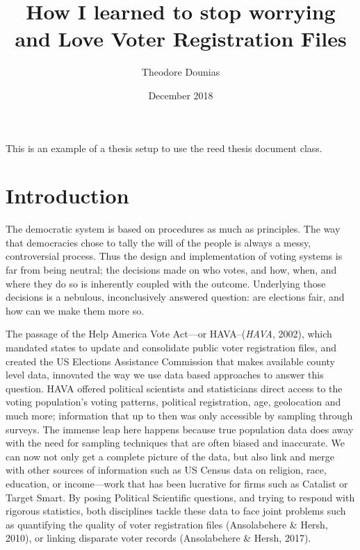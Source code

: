 \documentclass[12pt,twoside]{reedthesis}
\title{How I learned to stop worrying and Love Voter Registration Files}
\author{Theodore Dounias}
\date{December 2018}
\begin{document}
      \maketitle
  
  \frontmatter %
  \pagestyle{empty} %

  
      \begin{preface}
      This is an example of a thesis setup to use the reed thesis document
      class.
    \end{preface}
  
      \hypersetup{linkcolor=black}
    \setcounter{tocdepth}{3}
    \tableofcontents
  
      \listoftables
  
      \listoffigures
  
  
  
  \mainmatter %
  \pagestyle{fancyplain} %

  \chapter*{Introduction}\label{introduction}
  
  The democratic system is based on procedures as much as principles. The
  way that democracies chose to tally the will of the people is always a
  messy, controversial process. Thus the design and implementation of
  voting systems is far from being neutral; the decisions made on who
  votes, and how, when, and where they do so is inherently coupled with
  the outcome. Underlying those decisions is a nebulous, inconclusively
  answered question: are elections fair, and how can we make them more so.
  
  The passage of the Help America Vote Act---or HAVA--(\emph{HAVA}, 2002),
  which mandated states to update and consolidate public voter
  registration files, and created the US Elections Assistance Commission
  that makes available county level data, innovated the way we use data
  based approaches to answer this question. HAVA offered political
  scientists and statisticians direct access to the voting population's
  voting patterns, political registration, age, geolocation and much more;
  information that up to then was only accessible by sampling through
  surveys. The immense leap here happens because true population data does
  away with the need for sampling techniques that are often biased and
  inaccurate. We can now not only get a complete picture of the data, but
  also link and merge with other sources of information such as US Census
  data on religion, race, education, or income---work that has been
  lucrative for firms such as Catalist or Target Smart. By posing
  Political Scientific questions, and trying to respond with rigorous
  statistics, both disciplines tackle these data to face joint problems
  such as quantifying the quality of voter registration files
  (Ansolabehere \& Hersh, 2010), or linking disparate voter records
  (Ansolabehere \& Hersh, 2017).
  
\end{document}

